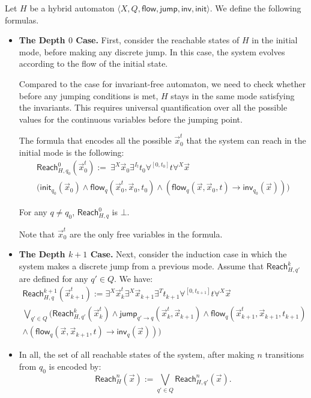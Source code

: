 \documentclass[envcountsect]{llncs}
\newcommand{\flow}{\mathsf{flow}}
\newcommand{\jump}{\mathsf{jump}}
\newcommand{\inv}{\mathsf{inv}}
\newcommand{\init}{\mathsf{init}}
\newcommand{\reach}{\mathsf{Reach}}
\begin{document}
\begin{definition}[$\reach_H^n(\vec x)$, General Case]

Let $H$ be a hybrid automaton $\langle X, Q, \flow, \jump, \inv, \init\rangle$. We define the following formulas. 

\begin{itemize}
\item {\bf The Depth $0$ Case.} First, consider the reachable states of $H$ in the initial mode, before making any discrete jump. In this case, the system evolves according to the flow of the initial state. 

Compared to the case for invariant-free automaton, we need to check whether before any jumping conditions is met, $H$ stays in the same mode satisfying the invariants. This requires universal quantification over all the possible values for the continuous variables before the jumping point. 

The formula that encodes all the possible $\vec x_0^t$ that the system can reach in the initial mode is the following:
\begin{multline*}
\reach^0_{H,q_0} (\vec x_0^t):=\ \exists^X \vec x_0 \exists^{I_t} t_0\forall^{[0,t_0]} t\forall^X \vec x\\ \Big(\init_{q_0}(\vec x_0)\wedge \flow_q(\vec x_0^t, \vec x_0, t_0)\wedge (\flow_q(\vec x, \vec x_0, t)\rightarrow\inv_{q_0}(\vec x))\Big)
\end{multline*}

For any $q\neq q_0$, $\reach^0_{H,q}$ is $\bot$. 

Note that $\vec x_0^t$ are the only free variables in the formula. 



\item {\bf The Depth $k+1$ Case.} Next, consider the induction case in which the system makes a discrete jump from a previous mode. Assume that $\reach^k_{H,q'}$ are defined for any $q'\in Q$. We have:
\begin{multline*}
\reach^{k+1}_{H,q}(\vec x_{k+1}^t):=  \exists^X \vec x_k^t \exists^X \vec x_{k+1}\exists^{T} t_{k+1}\forall^{[0,t_{k+1}]}t\forall^X \vec x \\
\bigvee_{q'\in Q} (\reach^k_{H,q'} (\vec x_k^t) \wedge \jump_{q'\rightarrow q}(\vec x_k^t, \vec x_{k+1}) \wedge \flow_{q}(\vec x_{k+1}^t, \vec x_{k+1}, t_{k+1})\\
\wedge(\flow_q(\vec x, \vec x_{k+1}, t)\rightarrow \inv_q(\vec x)))
\end{multline*}


\item In all, the set of all reachable states of the system, after making $n$ transitions from $q_0$ is encoded by: 
$$\reach^n_{H}(\vec x) := \bigvee_{q'\in Q} \reach^n_{H,q'}(\vec x).$$


\end{itemize}
\end{definition}
\end{document}
